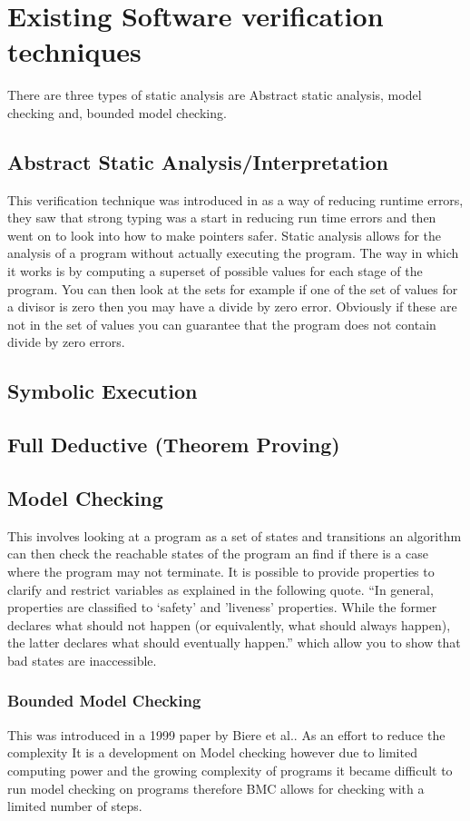 \documentclass[a4paper,12pt]{scrartcl}
\begin{document}
	\section{Existing Software verification techniques}
	{
		There are three types of static analysis are Abstract static analysis, model checking and, bounded model checking.\cite{DSilva2008} 
		\subsection{Abstract Static Analysis/Interpretation}
		{
			This verification technique was introduced in \cite{Cousot1977} as a way of reducing runtime errors, they saw that strong typing was a start in reducing run time errors and then went on to look into how to make pointers safer. Static analysis allows for the analysis of a program without actually executing the program. The way in which it works is by computing a superset of possible values for each stage of the program. You can then look at the sets for example if one of the set of values for a divisor is zero then you may have a divide by zero error. Obviously if these are not in the set of values you can guarantee that the program does not contain divide by zero errors.
		}
		\subsection{Symbolic Execution}
		{
			
		}
		\subsection{Full Deductive (Theorem Proving)}
		{
			
		}
		\subsection{Model Checking}
		{
			This involves looking at a program as a set of states and transitions an algorithm can then check the reachable states of the program an find if there is a case where the program may not terminate\cite{DSilva2008}. It is possible to provide properties to clarify and restrict variables as explained in the following quote. \enquote{In general, properties are classified to ‘safety’ and ’liveness’ properties. While the former declares what should not happen (or equivalently, what should always happen), the latter declares what should eventually happen.}\cite{Biere2003} which allow you to show that bad states are inaccessible.
			\subsubsection{Bounded Model Checking}
			{
				This was introduced in a 1999 paper by Biere et al.\cite{Biere1999}. As an effort to reduce the complexity It is a development on Model checking however due to limited computing power and the growing complexity of programs it became difficult to run model checking on programs therefore BMC allows for checking with a limited number of steps.
			}
		}

	}
	
\end{document}
